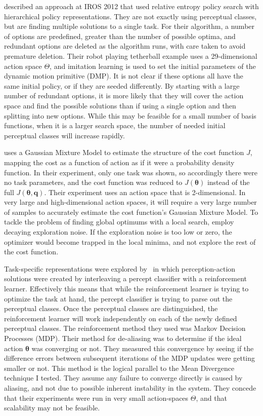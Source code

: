 \documentclass[12pt]{article}
\newcommand{\appsp}  {\ensuremath{\Theta}}
\newcommand{\taskp}  {\ensuremath{\mathbf{q}}}
\newcommand{\costf}  {\ensuremath{J}}
\newcommand{\app}    {\ensuremath{\bm{\theta}}}
\begin{document}
\citet{daniel12learning} described an approach at IROS 2012  that used relative entropy policy search with hierarchical policy representations. They are not exactly using perceptual classes, but are finding multiple solutions to a single task. For their algorithm, a number of options are predefined, greater than the number of possible optima, and redundant options are deleted as the algorithm runs, with care taken to avoid premature deletion. Their robot playing tetherball example uses a 29-dimensional action space $\appsp$, and imitation learning is used to set the initial parameters of the dynamic motion primitive (DMP). It is not clear if these options all have the same initial policy, or if they are seeded differently. By starting with a large number of redundant options, it is more likely that they will cover the action space and find the possible solutions than if using a single option and then splitting into new options. While this may be feasible for a small number of basis functions, when it is a larger search space, the number of needed initial perceptual classes will increase rapidly. 

\citet{calinon13compliant} uses a Gaussian Mixture Model to estimate the structure of the cost function \costf, mapping the cost as a function of action as if it were a probability density function. In their experiment, only one task was shown, so accordingly there were no task parameters, and the cost function was reduced to $\costf(\app)$ instead of the full $\costf(\app,\taskp)$. Their experiment uses an action space that is 2-dimensional. In very large and high-dimensional action spaces, it will require a very large number of samples to accurately estimate the cost function's Gaussian Mixture Model. To tackle the problem of finding global optimums with a local search, \citet{calinon13compliant} employ decaying exploration noise. If the exploration noise is too low or zero, the optimizer would become trapped in the local minima, and not explore the rest of the cost function.

Task-specific representations were explored by~\cite{piater11learning} in which perception-action solutions were created by interleaving a percept classifier with a reinforcement learner. Effectively this means that while the reinforcement learner is trying to optimize the task at hand, the percept classifier is trying to parse out the perceptual classes. Once the perceptual classes are distinguished, the reinforcement learner will work independently on each of the newly defined perceptual classes. The reinforcement method they used was Markov Decision Processes (MDP). Their method for de-aliasing was to determine if the ideal action $\app$ was converging or not. They measured this convergence by seeing if the difference errors between subsequent iterations of the MDP updates were getting smaller or not. This method is the logical parallel to the Mean Divergence technique I tested. They assume any failure to converge directly is caused by aliasing, and not due to possible inherent instability in the system. They concede that their experiments were run in very small action-spaces $\appsp$, and that scalability may not be feasible. 
\end{document}
